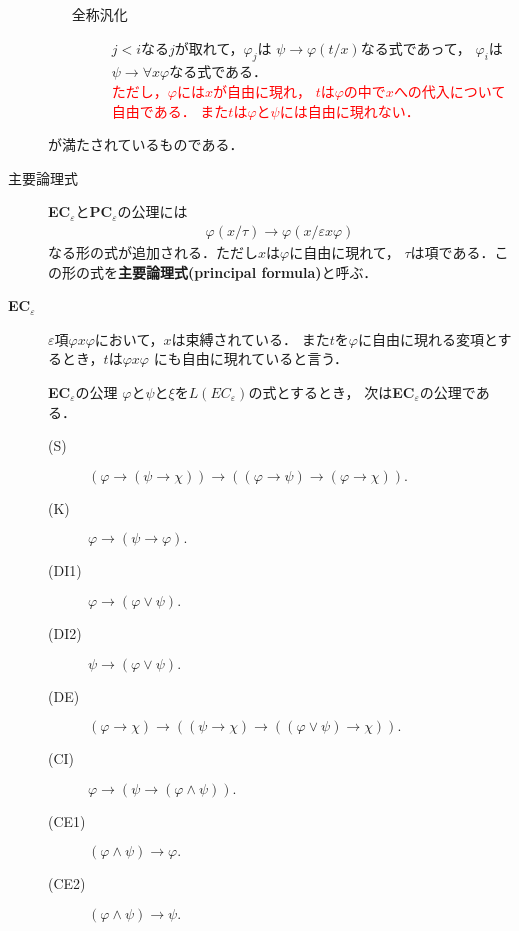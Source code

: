 \begin{description}
\begin{itemize}
\begin{description}
			\item[全称汎化] 
				$j < i$なる$j$が取れて，$\varphi_{j}$は
				$\psi \rightarrow \varphi(t/x)$なる式であって，
				$\varphi_{i}$は$\psi \rightarrow \forall x \varphi$なる式である．
				\\ \textcolor{red}{ただし，$\varphi$には$x$が自由に現れ，
				$t$は$\varphi$の中で$x$への代入について自由である．
				また$t$は$\varphi$と$\psi$には自由に現れない．}
		\end{description} 
	\end{itemize}
	が満たされているものである．
	
	\item[主要論理式]
	{\bf EC}${}_{\varepsilon}$と{\bf PC}${}_{\varepsilon}$の公理には
	\begin{align}
		\varphi(x/\tau) \rightarrow \varphi(x/\varepsilon x \varphi)
	\end{align}
	なる形の式が追加される．ただし$x$は$\varphi$に自由に現れて，
	$\tau$は項である．この形の式を{\bf 主要論理式}{\bf (principal formula)}と呼ぶ．
	
	\item[{\bf EC}${}_{\varepsilon}$]
	
		$\varepsilon$項$\varphi x \varphi$において，$x$は束縛されている．
		また$t$を$\varphi$に自由に現れる変項とするとき，$t$は$\varphi x \varphi$
		にも自由に現れていると言う．
	
	\begin{itembox}[l]{{\bf EC}${}_{\varepsilon}$の公理}
		$\varphi$と$\psi$と$\xi$を$L(EC_{\varepsilon})$の式とするとき，
		次は{\bf EC}${}_{\varepsilon}$の公理である．
		\begin{description}
			\item[(S)] $(\varphi \rightarrow (\psi \rightarrow \chi)) 
				\rightarrow ((\varphi \rightarrow \psi)
				\rightarrow (\varphi \rightarrow \chi)).$
			\item[(K)] $\varphi \rightarrow (\psi \rightarrow \varphi).$
			\item[(DI1)] $\varphi \rightarrow (\varphi \vee \psi).$
			\item[(DI2)] $\psi \rightarrow (\varphi \vee \psi).$
			\item[(DE)] $(\varphi \rightarrow \chi) \rightarrow 
				((\psi \rightarrow \chi) \rightarrow ((\varphi \vee \psi) \rightarrow \chi)).$
			\item[(CI)] $\varphi \rightarrow (\psi \rightarrow (\varphi \wedge \psi)).$
			\item[(CE1)] $(\varphi \wedge \psi) \rightarrow \varphi.$
			\item[(CE2)] $(\varphi \wedge \psi) \rightarrow \psi.$
				

\end{description}
\end{itembox}
\end{description}
